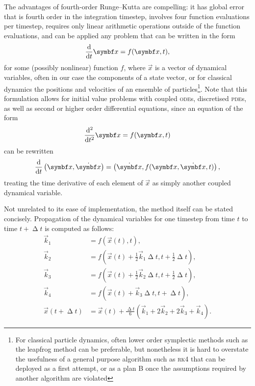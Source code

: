 The advantages of fourth-order Runge--Kutta are compelling: it has global error that is fourth order in the integration timestep, involves four function evaluations per timestep, requires only linear arithmetic operations outside of the function evaluations, and can be applied any problem that can be written in the form
\begin{align}
\dv t \vec x = f(\vec x, t),
\end{align}
for some (possibly nonlinear) function $f$, where $\vec{x}$ is a vector of dynamical variables, often in our case the components of a state vector, or for classical dynamics the positions and velocities of an ensemble of particles\footnote{For classical particle dynamics, often lower order symplectic methods such as the leapfrog method \cite{Skeel97afamily} can be preferable, but nonetheless it is hard to overstate the usefulness of a general purpose algorithm such as \textsc{rk4} that can be deployed as a first attempt, or as a plan B once the assumptions required by another algorithm are violated}. Note that this formulation allows for initial value problems with coupled \textsc{ode}s, discretised \textsc{pde}s, as well as second or higher order differential equations, since an equation of the form
\begin{align}
\dv[2] t \vec x = f(\vec x, t)
\end{align}
can be rewritten
\begin{align}
\dv t \left(\vec x, \dot{\vec x}\right) = \left(\dot{\vec x}, f(\vec x, \dot{\vec x}, t)\right),
\end{align}
treating the time derivative of each element of $\vec x$ as simply another coupled dynamical variable.

Not unrelated to its ease of implementation, the method itself can be stated concisely. Propagation of the dynamical variables for one timestep from time $t$ to time $t + \upDelta t$ is computed as follows:
\begin{align}
\vec k_1 &= f(\vec x(t), t),\nonumber\\
\vec k_2 &= f(\vec x(t) + \tfrac12 \vec k_1\upDelta t, t + \tfrac12\upDelta t),\nonumber\\
\vec k_3 &= f(\vec x(t) + \tfrac12 \vec k_2\upDelta t, t + \tfrac12\upDelta t),\nonumber\\
\vec k_4 &= f(\vec x(t) + \vec k_3\upDelta t, t + \upDelta t),\nonumber\\
\vec x(t + \upDelta t) &= \vec x(t)
+ \tfrac{\upDelta t}6(\vec k_1 + 2\vec k_2 + 2\vec k_3 + \vec k_4).\label{eq:rk4}
\end{align}

